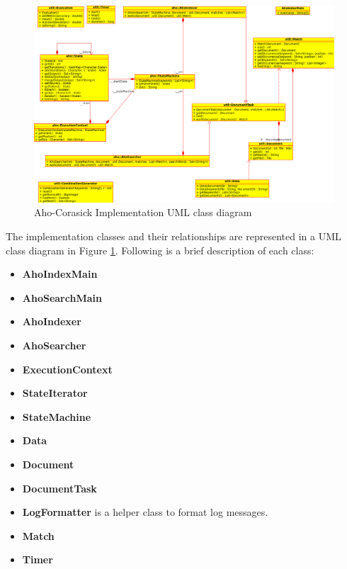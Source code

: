\documentclass[10pt]{report}
\begin{document}
\begin{figure}
  \begin{center}
	\includegraphics[width=\textwidth,height=!]{ahouml}
  \end{center}
  \caption{Aho-Corasick Implementation UML class diagram}
  \label{fig:ahouml}
\end{figure} 

The implementation classes and their relationships are represented in a UML
class diagram in Figure \ref{fig:ahouml}. Following is a brief
description of each class:

\begin{itemize}
\item \textbf{AhoIndexMain}

\item \textbf{AhoSearchMain} 

\item \textbf{AhoIndexer}

\item \textbf{AhoSearcher} 

\item \textbf{ExecutionContext} 

\item \textbf{StateIterator} 

\item \textbf{StateMachine} 

\item \textbf{Data} 

\item \textbf{Document} 

\item \textbf{DocumentTask} 

\item \textbf{LogFormatter} is a helper class to format log messages.

\item \textbf{Match}

\item \textbf{Timer}

\end{itemize}
\end{document}
